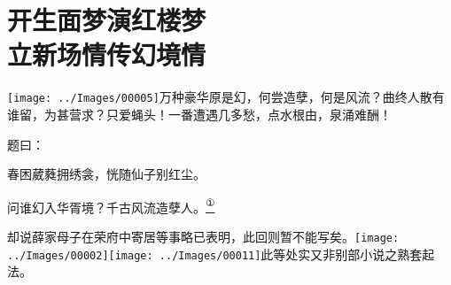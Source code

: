 

\chapter{开生面梦演红楼梦\\立新场情传幻境情}\label{part0009_split_000.htmlux5cux23calibre_pb_0}

{\texttt{[image: ../Images/00005]}\kaishu 万种豪华原是幻，何尝造孽，何是风流？曲终人散有谁留，为甚营求？只爱蝇头！一番遭遇几多愁，点水根由，泉涌难酬！}

题曰：

春困葳蕤拥绣衾，恍随仙子别红尘。

问谁幻入华胥境？千古风流造孽人。\href{../Text/part0009_split_000.html\#lnkback_1_a}{\textsuperscript{①}}

却说薛家母子在荣府中寄居等事略已表明，此回则暂不能写矣。{\texttt{[image: ../Images/00002]}\texttt{[image: ../Images/00011]}\footnotesize \kaishu 此等处实又非别部小说之熟套起法。}

